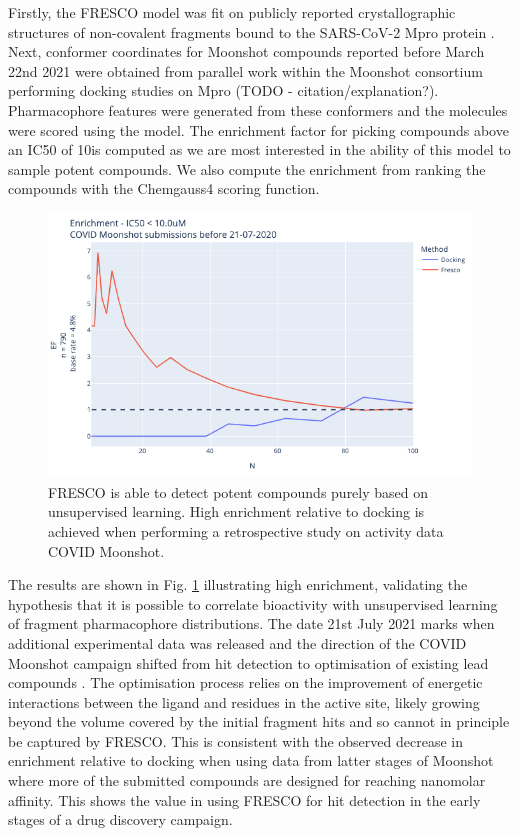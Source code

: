 Firstly, the FRESCO model was fit on publicly reported crystallographic structures of non-covalent fragments bound to the SARS-CoV-2 Mpro protein \cite{Douangamath2020XChem}. Next, conformer coordinates for Moonshot compounds reported before March 22nd 2021 were obtained from parallel work within the Moonshot consortium performing docking studies on Mpro (TODO - citation/explanation?). Pharmacophore features were generated from these conformers and the molecules were scored using the model. The enrichment factor for picking compounds above an IC50 of 10\uM is computed as we are most interested in the ability of this model to sample potent compounds. We also compute the enrichment from ranking the compounds with the Chemgauss4 scoring function.

\begin{figure}
    \centering
    \includegraphics[width=\textwidth]{Ch2/Figs/enrichment_vs_docking.png}
    \caption{FRESCO is able to detect potent compounds purely based on unsupervised learning. High enrichment relative to docking is achieved when performing a retrospective study on activity data COVID Moonshot.}
    \label{fig:moonshot_enrichment_vs_docking}
\end{figure}

The results are shown in Fig. \ref{fig:moonshot_enrichment_vs_docking} illustrating high enrichment, validating the hypothesis that it is possible to correlate bioactivity with unsupervised learning of fragment pharmacophore distributions. The date 21st July 2021 marks when additional experimental data was released and the direction of the COVID Moonshot campaign shifted from hit detection to optimisation of existing lead compounds \cite{Moonshot2021DataRelease}. The optimisation process relies on the improvement of energetic interactions between the ligand and residues in the active site, likely growing beyond the volume covered by the initial fragment hits and so cannot in principle be captured by FRESCO. This is consistent with the observed decrease in enrichment relative to docking when using data from latter stages of Moonshot where more of the submitted compounds are designed for reaching nanomolar affinity. This shows the value in using FRESCO for hit detection in the early stages of a drug discovery campaign.

